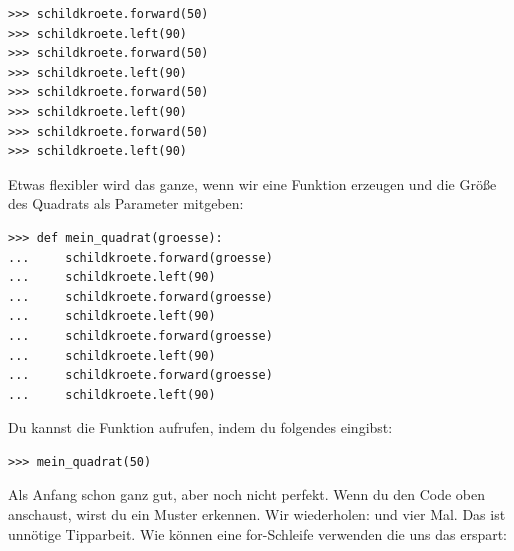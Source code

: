 \begin{Verbatim}[frame=single]
>>> schildkroete.forward(50)
>>> schildkroete.left(90)
>>> schildkroete.forward(50)
>>> schildkroete.left(90)
>>> schildkroete.forward(50)
>>> schildkroete.left(90)
>>> schildkroete.forward(50)
>>> schildkroete.left(90)
\end{Verbatim}

Etwas flexibler wird das ganze, wenn wir eine Funktion erzeugen und die Größe des Quadrats als Parameter mitgeben:

\begin{Verbatim}[frame=single]
>>> def mein_quadrat(groesse):
...     schildkroete.forward(groesse)
...     schildkroete.left(90)
...     schildkroete.forward(groesse)
...     schildkroete.left(90)
...     schildkroete.forward(groesse)
...     schildkroete.left(90)
...     schildkroete.forward(groesse)
...     schildkroete.left(90)
\end{Verbatim}

\noindent
Du kannst die Funktion aufrufen, indem du folgendes eingibst:

\begin{Verbatim}[frame=single]
>>> mein_quadrat(50)
\end{Verbatim}

Als Anfang schon ganz gut, aber noch nicht perfekt. Wenn du den Code oben anschaust, wirst du ein Muster erkennen. Wir wiederholen:  und  vier Mal. Das ist unnötige Tipparbeit. Wie können eine for-Schleife verwenden die uns das erspart:

